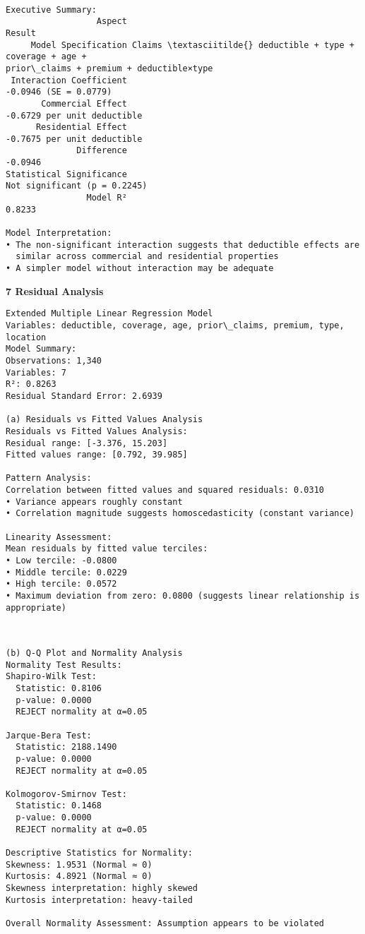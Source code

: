 \documentclass[8pt, twocolumn]{extarticle}
\begin{document}
    { \hspace*{\fill} \\}
    \begin{Verbatim}[commandchars=\\\{\}]
Executive Summary:
                  Aspect
Result
     Model Specification Claims \textasciitilde{} deductible + type + coverage + age +
prior\_claims + premium + deductible×type
 Interaction Coefficient
-0.0946 (SE = 0.0779)
       Commercial Effect
-0.6729 per unit deductible
      Residential Effect
-0.7675 per unit deductible
              Difference
-0.0946
Statistical Significance
Not significant (p = 0.2245)
                Model R²
0.8233

Model Interpretation:
• The non-significant interaction suggests that deductible effects are
  similar across commercial and residential properties
• A simpler model without interaction may be adequate
    \end{Verbatim}
    \textbf{7 Residual Analysis}
    \begin{Verbatim}[commandchars=\\\{\}]
Extended Multiple Linear Regression Model
Variables: deductible, coverage, age, prior\_claims, premium, type, location
Model Summary:
Observations: 1,340
Variables: 7
R²: 0.8263
Residual Standard Error: 2.6939

(a) Residuals vs Fitted Values Analysis
Residuals vs Fitted Values Analysis:
Residual range: [-3.376, 15.203]
Fitted values range: [0.792, 39.985]

Pattern Analysis:
Correlation between fitted values and squared residuals: 0.0310
• Variance appears roughly constant
• Correlation magnitude suggests homoscedasticity (constant variance)

Linearity Assessment:
Mean residuals by fitted value terciles:
• Low tercile: -0.0800
• Middle tercile: 0.0229
• High tercile: 0.0572
• Maximum deviation from zero: 0.0800 (suggests linear relationship is
appropriate)
    \end{Verbatim}
    \begin{center}
    \end{center}
    { \hspace*{\fill} \\}
    \begin{Verbatim}[commandchars=\\\{\}]
(b) Q-Q Plot and Normality Analysis
Normality Test Results:
Shapiro-Wilk Test:
  Statistic: 0.8106
  p-value: 0.0000
  REJECT normality at α=0.05

Jarque-Bera Test:
  Statistic: 2188.1490
  p-value: 0.0000
  REJECT normality at α=0.05

Kolmogorov-Smirnov Test:
  Statistic: 0.1468
  p-value: 0.0000
  REJECT normality at α=0.05

Descriptive Statistics for Normality:
Skewness: 1.9531 (Normal ≈ 0)
Kurtosis: 4.8921 (Normal ≈ 0)
Skewness interpretation: highly skewed
Kurtosis interpretation: heavy-tailed

Overall Normality Assessment: Assumption appears to be violated
    \end{Verbatim}
\end{document}
